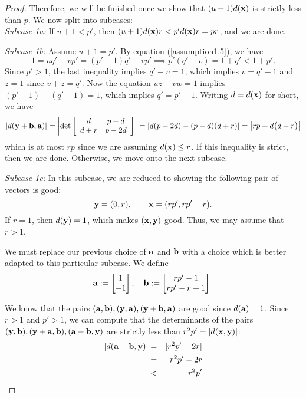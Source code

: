 \begin{proof}
	Therefore, we will be finished once we show that $(u+1)d({\mathbf{x}})$ is strictly less than $p$. We now split into subcases:\\[2mm]
	
	\noindent\emph{Subcase 1a:} If $u + 1 < p'$, then $(u+1)d({\mathbf{x}})r < p'd({\mathbf{x}})r = pr$, and we are done. 
	
	\noindent \emph{Subcase 1b:} Assume $u + 1 = p'$. By equation (\ref{assumption1.5}), we have 
	\[
	1 = uq' - vp' = (p'-1)q' - vp'  \implies p'(q'-v) = 1 + q' < 1 + p'.
	\]
	Since $p' > 1$, the last inequality implies $q' - v = 1$, which implies $v = q'-1$ and $z = 1$ since $v + z = q'$. Now the equation $uz-vw = 1$ implies $(p'-1)-(q'-1) = 1$, which implies $q' = p'-1$. Writing $d=d({\mathbf{x}})$ for short, we have 
	\[
	\lvert d({\mathbf{y}} + {\mathbf{b}}, {\mathbf{a}}) \rvert = \left| \det\left[ \begin{array}{cc}d&p -d\\d + r&p-2d\end{array}\right] \right| =  \left| d(p-2d) - (p-d)(d+r) \right| =  \left| rp + d\big(d-r\big) \right|
	\]
	which is at most $rp$ since we are assuming $d({\mathbf{x}}) \leq r$. If this inequality is strict, then we are done. Otherwise, we move onto the next subcase.
	
	\noindent\emph{Subcase 1c:} In this subcase, we are reduced to showing the following pair of vectors is good: 
	\[
	{\mathbf{y}} = (0,r),\quad \quad {\mathbf{x}} = (rp', rp'-r).
	\]
	If $r=1$, then $d({\mathbf{y}})=1$, which makes $({\mathbf{x}},{\mathbf{y}})$ good. Thus, we may assume that $r>1$. 
	
	We must replace our previous choice of ${\mathbf{a}}$ and ${\mathbf{b}}$ with a choice which is better adapted to this particular subcase. We define
	\[
	{\mathbf{a}} := \begin{bmatrix} 1\\-1 \end{bmatrix},\quad {\mathbf{b}} := \begin{bmatrix} rp'-1\\rp' - r + 1 \end{bmatrix}.
	\]

	We know that the pairs $({\mathbf{a}}, {\mathbf{b}}), ({\mathbf{y}}, {\mathbf{a}}), ({\mathbf{y}}+{\mathbf{b}},{\mathbf{a}})$ are good since $d({\mathbf{a}})=1$. Since $r > 1$ and $p'>1$, we can compute that the determinants of the pairs $({\mathbf{y}},{\mathbf{b}}), ({\mathbf{y}}+{\mathbf{a}},{\mathbf{b}}), ({\mathbf{a}}-{\mathbf{b}},{\mathbf{y}})$ are strictly less than $r^2p' = \lvert d({\mathbf{x}},{\mathbf{y}}) \rvert$:
	\begin{eqnarray*}
		\lvert d({\mathbf{a}}-{\mathbf{b}},{\mathbf{y}})\rvert &=&  \lvert r^2p' - 2r \rvert \\
		&=& r^2p' - 2r \\
		&<& r^2p'
	\end{eqnarray*}


\end{proof}
